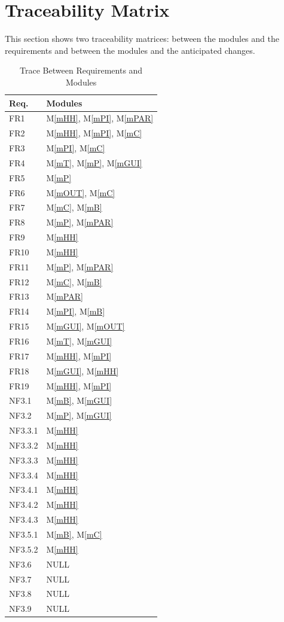 \documentclass[12pt, titlepage]{article}
\newcommand{\mref}[1]{M\ref{#1}}
\begin{document}
\section{Traceability Matrix} \label{SecTM}

This section shows two traceability matrices: between the modules and the
requirements and between the modules and the anticipated changes.

\begin{table}[H]
\centering
\begin{tabular}{p{} p{}}
\toprule
\textbf{Req.} & \textbf{Modules}\\
\midrule
FR1 & \mref{mHH}, \mref{mPI}, \mref{mPAR}\\
FR2 & \mref{mHH}, \mref{mPI}, \mref{mC}\\
FR3 & \mref{mPI}, \mref{mC}\\
FR4 & \mref{mT}, \mref{mP}, \mref{mGUI}\\
FR5 & \mref{mP}\\
FR6 & \mref{mOUT}, \mref{mC}\\
FR7 & \mref{mC}, \mref{mB}\\
FR8 & \mref{mP}, \mref{mPAR}\\
FR9 & \mref{mHH}\\
FR10 & \mref{mHH}\\
FR11 & \mref{mP}, \mref{mPAR}\\
FR12 & \mref{mC}, \mref{mB}\\
FR13 & \mref{mPAR}\\
FR14 & \mref{mPI}, \mref{mB}\\
FR15 & \mref{mGUI}, \mref{mOUT}\\
FR16 & \mref{mT}, \mref{mGUI}\\
FR17 & \mref{mHH}, \mref{mPI}\\
FR18 & \mref{mGUI}, \mref{mHH}\\
FR19 & \mref{mHH}, \mref{mPI}\\

NF3.1 & \mref{mB}, \mref{mGUI}\\
NF3.2 & \mref{mP}, \mref{mGUI}\\
NF3.3.1 & \mref{mHH}\\
NF3.3.2 & \mref{mHH}\\
NF3.3.3 & \mref{mHH}\\
NF3.3.4 & \mref{mHH}\\
NF3.4.1 & \mref{mHH}\\
NF3.4.2 & \mref{mHH}\\
NF3.4.3 & \mref{mHH}\\
NF3.5.1 & \mref{mB}, \mref{mC}\\
NF3.5.2 & \mref{mHH}\\
NF3.6 & NULL\\
NF3.7 & NULL\\
NF3.8 & NULL\\
NF3.9 & NULL\\

\bottomrule
\end{tabular}
\caption{Trace Between Requirements and Modules}
\label{TblRT}
\end{table}
\end{document}

